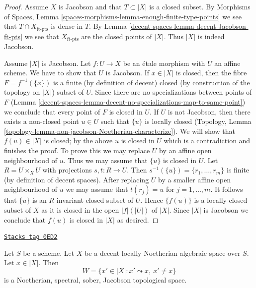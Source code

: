 \begin{proof}
Assume $X$ is Jacobson and that $T \subset |X|$ is a closed subset.
By Morphisms of Spaces, Lemma
\ref{spaces-morphisms-lemma-enough-finite-type-points}
we see that $T \cap X_{\text{ft-pts}}$ is dense in $T$.
By Lemma \ref{decent-spaces-lemma-decent-Jacobson-ft-pts} we see that
$X_{\text{ft-pts}}$ are the
closed points of $|X|$. Thus $|X|$ is indeed Jacobson.

\medskip\noindent
Assume $|X|$ is Jacobson. Let $f : U \to X$ be an \'etale
morphism with $U$ an affine scheme. We have to show that $U$
is Jacobson. If $x \in |X|$ is closed,
then the fibre $F = f^{-1}(\{x\})$ is a finite (by definition of
decent) closed (by construction of the topology on $|X|$) subset of $U$.
Since there are no specializations between points of $F$
(Lemma \ref{decent-spaces-lemma-decent-no-specializations-map-to-same-point})
we conclude that every point of $F$ is closed in $U$.
If $U$ is not Jacobson, then there exists a non-closed point
$u \in U$ such that $\{u\}$ is locally closed (Topology, Lemma
\ref{topology-lemma-non-jacobson-Noetherian-characterize}).
We will show that $f(u) \in |X|$ is closed; by the above $u$
is closed in $U$ which is a contradiction and finishes
the proof. To prove this we may replace $U$ by an affine open
neighbourhood of $u$.
Thus we may assume that $\{u\}$ is closed in $U$.
Let $R = U \times_X U$ with projections $s, t : R \to U$.
Then $s^{-1}(\{u\}) = \{r_1, \ldots, r_m\}$ is finite (by
definition of decent spaces). After replacing $U$ by a smaller affine
open neighbourhood of $u$ we may assume that $t(r_j) = u$ for
$j = 1, \ldots, m$. It follows that $\{u\}$ is an $R$-invariant
closed subset of $U$. Hence $\{f(u)\}$ is a locally closed subset
of $X$ as it is closed in the open $|f|(|U|)$ of $|X|$. Since $|X|$
is Jacobson we conclude that $f(u)$ is closed in $|X|$ as desired.
\end{proof}

\begin{lemma}
\label{decent-spaces-lemma-punctured-spec}
\href{https://stacks.math.columbia.edu/tag/0ED2}{\texttt{Stacks tag 0ED2}}

Let $S$ be a scheme. Let $X$ be a decent locally Noetherian algebraic
space over $S$. Let $x \in |X|$. Then
$$
W = \{x' \in |X| : x' \leadsto x,\ x' \not = x\}
$$
is a Noetherian, spectral, sober, Jacobson topological space.
\end{lemma}

